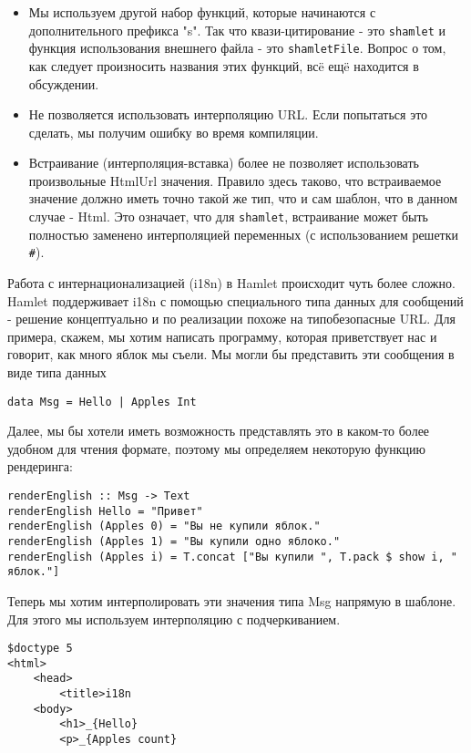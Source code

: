 \begin{itemize}
\item Мы используем другой набор функций, которые начинаются с дополнительного 
префикса "s". Так что квази-цитирование - это \texttt{shamlet} и функция 
использования внешнего файла - это \texttt{shamletFile}. Вопрос о том, как следует произносить
названия этих функций, всë ещë находится в обсуждении.
\item Не позволяется использовать интерполяцию URL. Если попытаться это сделать, 
мы получим ошибку во время компиляции.
\item Встраивание (интерполяция-вставка) более не позволяет использовать произвольные
HtmlUrl значения. Правило здесь таково, что встраиваемое значение должно иметь
точно такой же тип, что и сам шаблон, что в данном случае - Html. Это означает,
что для \texttt{shamlet}, встраивание может быть полностью заменено интерполяцией
переменных (с использованием решетки \texttt{#}).
\end{itemize}

Работа с интернационализацией (i18n) в Hamlet происходит чуть более сложно.
Hamlet поддерживает i18n с помощью специального типа данных для сообщений - решение
концептуально и по реализации похоже на типобезопасные URL. Для примера, скажем, 
мы хотим написать программу, которая приветствует нас и говорит, как много яблок 
мы съели. Мы могли бы представить эти сообщения в виде типа данных

\begin{lstlisting}
data Msg = Hello | Apples Int
\end{lstlisting}

Далее, мы бы хотели иметь возможность представлять это в каком-то более удобном
для чтения формате, поэтому мы определяем некоторую функцию рендеринга:
\begin{lstlisting}
renderEnglish :: Msg -> Text
renderEnglish Hello = "Привет"
renderEnglish (Apples 0) = "Вы не купили яблок."
renderEnglish (Apples 1) = "Вы купили одно яблоко."
renderEnglish (Apples i) = T.concat ["Вы купили ", T.pack $ show i, " яблок."]
\end{lstlisting}

Теперь мы хотим интерполировать эти значения типа Msg напрямую в шаблоне.
Для этого мы используем интерполяцию с подчеркиванием.

\begin{lstlisting}
$doctype 5
<html>
    <head>
        <title>i18n
    <body>
        <h1>_{Hello}
        <p>_{Apples count}
\end{lstlisting}

